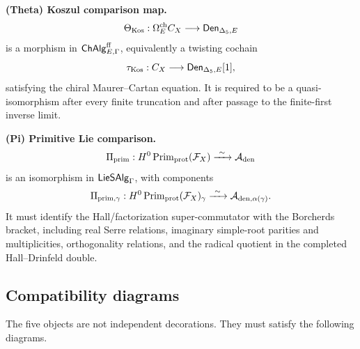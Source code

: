 \begin{definition}
\smallskip
\noindent
\textbf{(Theta) Koszul comparison map.}
\[
\Theta_{\mathrm{Kos}}:
\Omega^{\mathrm{ch}}_E C_X
\longrightarrow
\mathsf{Den}_{\Delta_5,E}
\]
is a morphism in \(\mathsf{ChAlg}^{\mathrm{ff}}_{E,\Gamma}\), equivalently a
twisting cochain
$$
\tau_{\mathrm{Kos}}:
C_X\longrightarrow \mathsf{Den}_{\Delta_5,E}[1],
$$
satisfying the chiral Maurer--Cartan equation.  It is required to be a
quasi-isomorphism after every finite truncation and after passage to the
finite-first inverse limit.

\smallskip
\noindent
\textbf{(Pi) Primitive Lie comparison.}
\[
\Pi_{\mathrm{prim}}:
H^0\operatorname{Prim}_{\mathrm{prot}}(\mathcal F_X)
\xrightarrow{\ \sim\ }
\mathcal A_{\mathrm{den}}
\]
is an isomorphism in \(\mathsf{LieSAlg}_{\Gamma}\), with components
$$
\Pi_{\mathrm{prim},\gamma}:
H^0\operatorname{Prim}_{\mathrm{prot}}(\mathcal F_X)_\gamma
\xrightarrow{\ \sim\ }
\mathcal A_{\mathrm{den},\alpha(\gamma)}.
$$
It must identify the Hall/factorization super-commutator with the
Borcherds bracket, including real Serre relations, imaginary simple-root
parities and multiplicities, orthogonality relations, and the radical
quotient in the completed Hall--Drinfeld double.
\end{definition}

\subsection{Compatibility diagrams}
\label{subsec:cell-eleven-diagrams}

The five objects are not independent decorations.  They must satisfy
the following diagrams.

